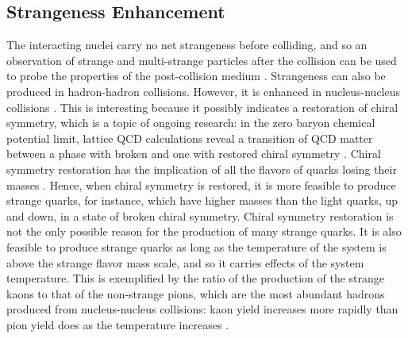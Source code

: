 \subsection{Strangeness Enhancement}
The interacting nuclei carry no net strangeness before colliding, and so an observation of strange and multi-strange particles after the collision can be used to probe the properties of the post-collision medium \cite{1742-6596-455-1-012005}. Strangeness can also be produced in hadron-hadron collisions. However, it is enhanced in nucleus-nucleus collisions \cite{Behera:2012eq}. This is interesting because it possibly indicates a restoration of chiral symmetry, which is a topic of ongoing research: in the zero baryon chemical potential limit, lattice QCD calculations reveal a transition of QCD matter between a phase with broken and one with restored chiral symmetry \cite{ refId0}. Chiral symmetry restoration has the implication of all the flavors of quarks losing their masses \cite{Sazdjian:2016hrz}. Hence, when chiral symmetry is restored, it is more feasible to produce strange quarks, for instance, which have higher masses than the light quarks, up and down, in a state of broken chiral symmetry. Chiral symmetry restoration is not the only possible reason for the production of many strange quarks. It is also feasible to produce strange quarks as long as the temperature of the system is above the strange flavor mass scale, and so it carries effects of the system temperature. This is exemplified by the ratio of the production of the strange kaons to that of the non-strange pions, which are the most abundant hadrons produced from nucleus-nucleus collisions: kaon yield increases more rapidly than pion yield does as the temperature increases%
 \cite{wong1994introduction}.

